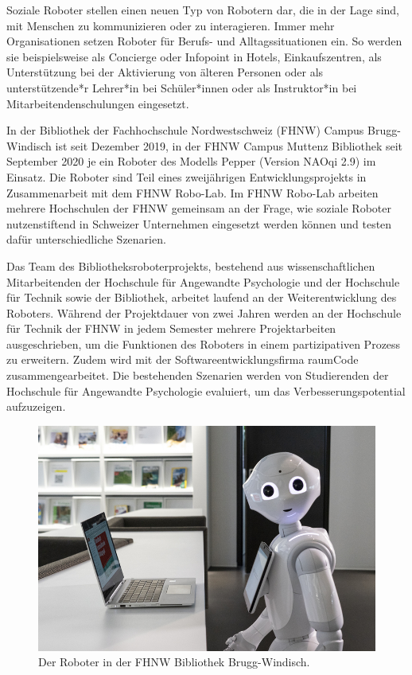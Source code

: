 \documentclass[a4paper,
fontsize=11pt,
oneside,
numbers=noperiodatend,
parskip=half-,
bibliography=totoc,
final
]{scrartcl}
\begin{document}
Soziale Roboter stellen einen neuen Typ von Robotern dar, die in der
Lage sind, mit Menschen zu kommunizieren oder zu interagieren. Immer
mehr Organisationen setzen Roboter für Berufs- und Alltagssituationen
ein. So werden sie beispielsweise als Concierge oder Infopoint in
Hotels, Einkaufszentren, als Unterstützung bei der Aktivierung von
älteren Personen oder als unterstützende*r Lehrer*in bei Schüler*innen
oder als Instruktor*in bei Mitarbeitendenschulungen eingesetzt.

In der Bibliothek der Fachhochschule Nordwestschweiz (FHNW) Campus
Brugg-Windisch ist seit Dezember 2019, in der FHNW Campus
Muttenz Bibliothek seit September 2020 je ein Roboter des Modells Pepper
(Version NAOqi 2.9) im Einsatz. Die Roboter sind Teil eines zweijährigen
Entwicklungsprojekts in Zusammenarbeit mit dem FHNW Robo-Lab. Im FHNW
Robo-Lab arbeiten mehrere Hochschulen der FHNW gemeinsam an der Frage,
wie soziale Roboter nutzenstiftend in Schweizer Unternehmen eingesetzt
werden können und testen dafür unterschiedliche Szenarien.

Das Team des Bibliotheksroboterprojekts, bestehend aus
wissenschaftlichen Mitarbeitenden der Hochschule für Angewandte
Psychologie und der Hochschule für Technik sowie der Bibliothek,
arbeitet laufend an der Weiterentwicklung des Roboters. Während der
Projektdauer von zwei Jahren werden an der Hochschule für Technik der
FHNW in jedem Semester mehrere Projektarbeiten ausgeschrieben, um die
Funktionen des Roboters in einem partizipativen Prozess zu erweitern.
Zudem wird mit der Softwareentwicklungsfirma raumCode
zusammengearbeitet. Die bestehenden Szenarien werden von Studierenden
der Hochschule für Angewandte Psychologie evaluiert, um das
Verbesserungspotential aufzuzeigen.

\begin{figure}
\centering
\includegraphics[width=.8\textwidth]{img/s_DSC8255.jpg}
\caption{Der Roboter in der FHNW Bibliothek Brugg-Windisch.}
\end{figure}
\end{document}
